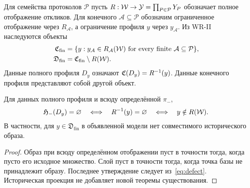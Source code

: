 \subsection{}
{Для семейства протоколов $\mathcal P$ пусть $R:\Wcal\to\mathcal Y=\prod_{P\in\mathcal P}Y_P$ обозначает полное отображение откликов. Для конечного $\mathcal A\subseteq\mathcal P$ обозначим ограниченное отображение через $R_{\mathcal A}$, а ограничение профиля $y$ через $y_{\mathcal A}$. Из WR-II наследуются объекты}
\begin{equation}\label{eq:defect}
\begin{aligned}
\mathfrak C_{\mathrm{fin}}
 &=\{y:y_{\mathcal A}\in R_{\mathcal A}(\Wcal)
       \text{ \Lang{for every finite}{для всякого конечного} }\mathcal A\subseteq\mathcal P\},\\
\mathfrak D_{\mathrm{fin}}&=\mathfrak C_{\mathrm{fin}}\setminus R(\Wcal).
\end{aligned}
\end{equation}
{Данные полного профиля $D_y$ означают $\Ccal(D_y)=R^{-1}(y)$. Данные конечного профиля представляют собой другой объект.}

\begin{proposition}
\label{prop:realizability-gate}
{Для данных полного профиля и всюду определённой $\pi_-$,}
\begin{equation}\label{eq:gate}
\Pcal(D_y)=\varnothing
\quad\Longleftrightarrow\quad R^{-1}(y)=\varnothing
\quad\Longleftrightarrow\quad y\notin R(\Wcal).
\end{equation}
{В частности, для $y\in\mathfrak D_{\mathrm{fin}}$ в объявленной модели нет совместимого исторического образа.}
\end{proposition}
\begin{proof}
{Образ при всюду определённом отображении пуст в точности тогда, когда пусто его исходное множество. Слой пуст в точности тогда, когда точка базы не принадлежит образу. Последнее утверждение следует из~\eqref{eq:defect}. Историческая проекция не добавляет новой теоремы существования.}
\end{proof}

